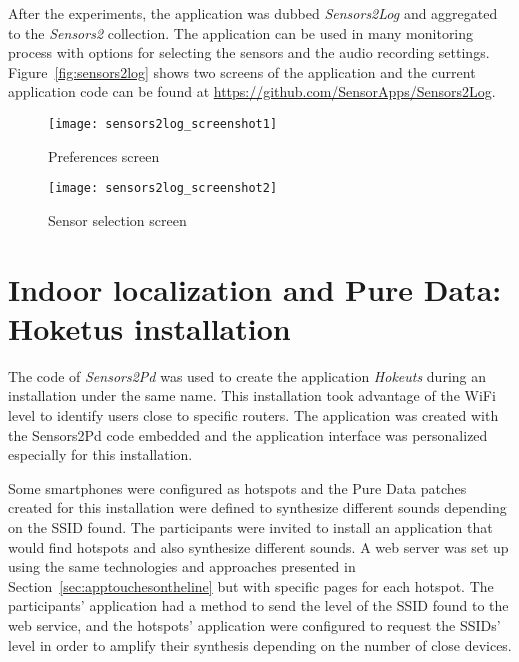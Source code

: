 After the experiments, the application was dubbed \textit{Sensors2Log} and aggregated to the \textit{Sensors2} collection.
The application can be used in many monitoring process with options for selecting the sensors and the audio recording settings.
Figure~\ref{fig:sensors2log} shows two screens of the application and the current application code can be found at \url{https://github.com/SensorApps/Sensors2Log}.

\begin{figure*}[!ht]
\centering
\begin{subfigure}{.35\textwidth}
	\texttt{[image: sensors2log\_screenshot1]}
    \caption{Preferences screen}
	\label{fig:appsensors2log1}
\end{subfigure}
\begin{subfigure}{.35\textwidth}
	\texttt{[image: sensors2log\_screenshot2]}
	\caption{Sensor selection screen}
	\label{fig:appsensors2log2}
\end{subfigure}

\caption{Screen-shots of \textit{Sensors2Log}.}
\label{fig:sensors2log}
\end{figure*}


\section{Indoor localization and Pure Data: Hoketus installation}
\label{sec:apphoketus}

The code of \textit{Sensors2Pd} was used to create the application \textit{Hokeuts} during an installation under the same name.
This installation took advantage of the WiFi level to identify users close to specific routers.
The application was created with the Sensors2Pd code embedded and the application interface was personalized especially for this installation. 

Some smartphones were configured as hotspots and the Pure Data patches created for this installation were defined to synthesize different sounds depending on the SSID found.
The participants were invited to install an application that would find hotspots and also synthesize different sounds.
A web server was set up using the same technologies and approaches presented in Section~\ref{sec:apptouchesontheline} but with specific pages for each hotspot.
The participants' application had a method to send the level of the SSID found to the web service, and the hotspots' application were configured to request the SSIDs' level in order to amplify their synthesis depending on the number of close devices.

